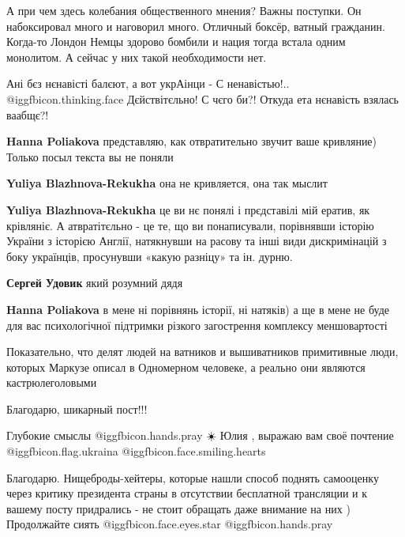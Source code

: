 \begin{itemize}
А при чем здесь колебания общественного мнения? Важны поступки. Он набоксировал
много и наговорил много. Отличный боксёр, ватный гражданин. Когда-то Лондон
Немцы здорово бомбили и нация тогда встала одним монолитом. А сейчас у них
такой необходимости нет.



Ані бєз нєнавісті балєют, а вот укрАінци - С ненавістью!.. @igg{fbicon.thinking.face} Дєйствітєльно! С
чєго би?! Откуда ета нєнавість взялась ваабщє?!

\begin{itemize} %
\textbf{Hanna Poliakova} представляю, как отвратительно звучит ваше кривляние) Только посыл текста вы не поняли

\textbf{Yuliya Blazhnova-Rekukha} она не кривляется, она так мыслит

\textbf{Yuliya Blazhnova-Rekukha} це ви нє понялі і прєдставілі мій ератив, як крівляніє. А атвратітєльно - це те, що ви понаписували, порівнявши історію України з історією Англії, натякнувши на расову та інші види дискримінацій з боку українців, просунувши «какую разніцу» та ін. дурню.

\textbf{Сергей Удовик} який розумний дядя

\textbf{Hanna Poliakova} в мене ні порівнянь історії, ні натяків) а ще в мене не буде для вас психологічної підтримки різкого загострення комплексу меншовартості
\end{itemize} %


Показательно, что делят людей на ватников и вышиватников примитивные люди,
которых Маркузе описал в Одномерном человеке, а реально они являются
кастрюлеголовыми


Благодарю, шикарный пост!!!

Глубокие смыслы  @igg{fbicon.hands.pray} ☀️
Юлия , выражаю вам своё почтение @igg{fbicon.flag.ukraina} @igg{fbicon.face.smiling.hearts} 

Благодарю.
Нищеброды-хейтеры, которые нашли способ поднять самооценку через критику президента страны в отсутствии бесплатной трансляции и к вашему посту придрались - не стоит обращать даже внимание на них )
Продолжайте сиять  @igg{fbicon.face.eyes.star}  @igg{fbicon.hands.pray} 



\end{itemize}
